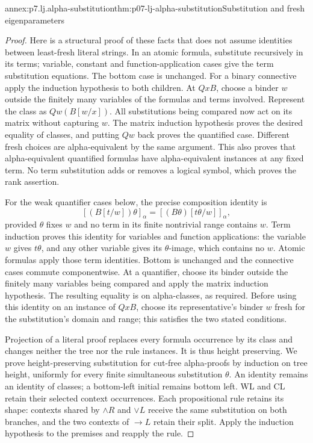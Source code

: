 \begin{annexitem}{annex:p7.lj.alpha-substitution}{thm:p07-lj-alpha-substitution}{Substitution and fresh eigenparameters}
\begin{proof}
Here is a structural proof of these facts that does not assume identities
between least-fresh literal strings.  In an atomic formula, substitute
recursively in its terms; variable, constant and function-application
cases give the term substitution equations.  The bottom case is unchanged.
For a binary connective apply the induction hypothesis to both children.
At \(QxB\), choose a binder \(w\) outside the finitely many variables
of the formulas and terms involved.  Represent the class as
\(Qw(B[w/x])\).  All substitutions being compared now act on its matrix
without capturing \(w\).  The matrix induction hypothesis proves the
desired equality of classes, and putting \(Qw\) back proves the quantified
case.  Different fresh choices are alpha-equivalent by the same argument.
This also proves that alpha-equivalent quantified formulas have
alpha-equivalent instances at any fixed term.  No term substitution adds
or removes a logical symbol, which proves the rank assertion.

For the weak quantifier cases below, the precise composition identity is
\[
 [(B[t/w])\theta]_\alpha
       =[(B\theta)[t\theta/w]]_\alpha,
\]
provided \(\theta\) fixes \(w\) and no term in its finite nontrivial
range contains \(w\).  Term induction proves this identity for variables
and function applications: the variable \(w\) gives \(t\theta\),
and any other variable gives its \(\theta\)-image, which contains no
\(w\).  Atomic formulas apply those term identities.  Bottom is unchanged
and the connective cases commute componentwise.  At a quantifier, choose
its binder outside the finitely many variables being compared and apply
the matrix induction hypothesis.  The resulting equality is on alpha-classes,
as required.  Before using this identity on an instance of \(QxB\),
choose its representative's binder \(w\) fresh for the substitution's
domain and range; this satisfies the two stated conditions.

Projection of a literal proof replaces every formula occurrence by its
class and changes neither the tree nor the rule instances.  It is thus
height preserving.  We prove height-preserving substitution for cut-free
alpha-proofs by induction on tree height, uniformly for every finite
simultaneous substitution \(\theta\).  An identity remains an identity
of classes; a bottom-left initial remains bottom left.  WL and CL retain
their selected context occurrences.  Each propositional rule retains its
shape: contexts shared by \(\land R\) and \(\lor L\) receive the same
substitution on both branches, and the two contexts of \(\to L\) retain
their split.  Apply the induction hypothesis to the premises and reapply
the rule.


\end{proof}
\end{annexitem}
